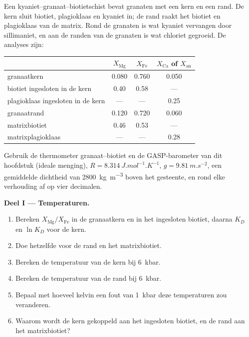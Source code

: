 \begin{problem}
\label{pb:b2:pt-paths:1}
Een kyaniet--granaat--biotietschist bevat granaten met een kern en een rand. De kern sluit
biotiet, plagioklaas en kyaniet in; de rand raakt het biotiet en plagioklaas van de
matrix. Rond de granaten is wat kyaniet vervangen door sillimaniet, en aan de randen van
de granaten is wat chloriet gegroeid. De analyses zijn:
\begin{center}
\small
\begin{tabular}{@{}lccc@{}}
\hline
 & $X_{\text{Mg}}$ & $X_{\text{Fe}}$ & $X_{\text{Ca}}$ of $X_{\text{an}}$\\
\hline
granaatkern & 0.080 & 0.760 & 0.050\\
biotiet ingesloten in de kern & 0.40 & 0.58 & ---\\
plagioklaas ingesloten in de kern & --- & --- & 0.25\\
granaatrand & 0.120 & 0.720 & 0.060\\
matrixbiotiet & 0.46 & 0.53 & ---\\
matrixplagioklaas & --- & --- & 0.28\\
\hline
\end{tabular}
\end{center}
Gebruik de thermometer granaat--biotiet en de GASP-barometer van dit hoofdstuk (ideale menging),
$R = \qty{8.314}{J.mol^{-1}.K^{-1}}$, $g = \qty{9.81}{m.s^{-2}}$, een gemiddelde dichtheid van
\qty{2800}{kg.m^{-3}} boven het gesteente, en rond elke verhouding af op vier decimalen.

\noindent\textbf{Deel I --- Temperaturen.}
\begin{enumerate}
\item Bereken $X_{\text{Mg}}/X_{\text{Fe}}$ in de granaatkern en in het ingesloten
biotiet, daarna $K_D$ en $\ln K_D$ voor de kern.
\item Doe hetzelfde voor de rand en het matrixbiotiet.
\item Bereken de temperatuur van de kern bij \qty{6}{kbar}.
\item Bereken de temperatuur van de rand bij \qty{6}{kbar}.
\item Bepaal met hoeveel kelvin een fout van \qty{1}{kbar} deze temperaturen zou veranderen.
\item Waarom wordt de kern gekoppeld aan het ingesloten biotiet, en de rand aan het
matrixbiotiet?
\end{enumerate}


\end{problem}

